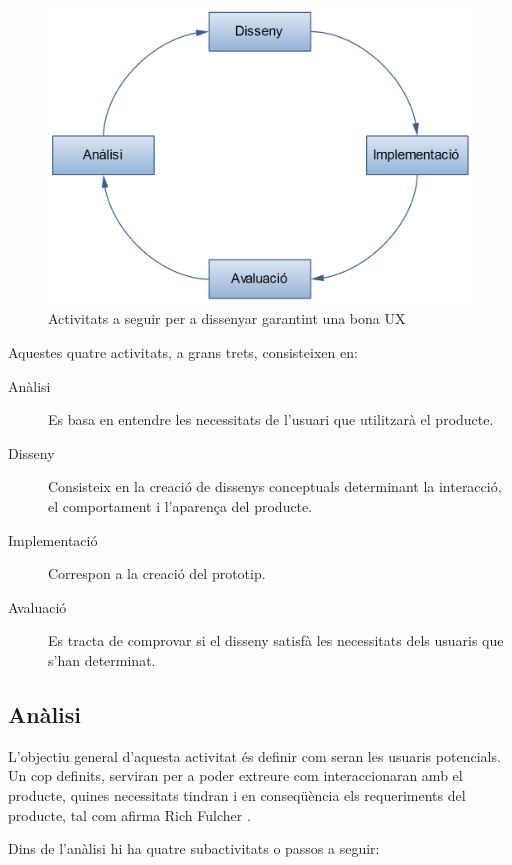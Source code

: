 \begin{figure}[htp]
\centering
\includegraphics[scale=0.6]{UX_wheel.png}
\caption{Activitats a seguir per a dissenyar garantint una bona \ac{UX}}\label{fig:UX_lifecycle}
\end{figure}

Aquestes quatre activitats, a grans trets, consisteixen en:
\begin{description}
\item [Anàlisi] Es basa en entendre les necessitats de l'usuari que utilitzarà el producte.
\item [Disseny] Consisteix en la creació de dissenys conceptuals determinant la interacció, el comportament i l'aparença del producte.
\item [Implementació] Correspon a la creació del prototip.
\item [Avaluació] Es tracta de comprovar si el disseny satisfà les necessitats dels usuaris que s'han determinat.
\end{description}

\subsection{Anàlisi}\label{sec:analisi}
L'objectiu general d'aquesta activitat és definir com seran les usuaris potencials. Un cop definits, serviran per a poder extreure com interaccionaran amb el producte, quines necessitats tindran i en conseqüència els requeriments del producte, tal com afirma Rich Fulcher \cite{user_centred_design}.

Dins de l'anàlisi hi ha quatre subactivitats o passos a seguir:

